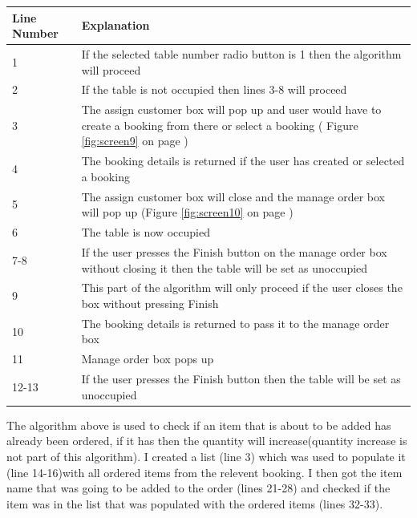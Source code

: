 \begin{center}
\begin{tabular}{|p{5cm}|p{7.5cm}|}
\hline
\textbf{Line Number} & \textbf{Explanation} \\ \hline
1 & If the selected table number radio button is 1 then the algorithm will proceed \\ \hline
2 & If the table is not occupied then lines 3-8 will proceed \\ \hline
3 & The assign customer box will pop up and user would have to create a booking from there or select a booking ( Figure \ref{fig:screen9} on page \pageref{fig:screen9}) \\ \hline
4 & The booking details is returned if the user has created or selected a booking \\ \hline
5 & The assign customer box will close and the manage order box will pop up  (Figure \ref{fig:screen10} on page \pageref{fig:screen10}) \\ \hline
6 & The table is now occupied \\ \hline
7-8 & If the user presses the Finish button on the manage order box without closing it then the table will be set as unoccupied \\ \hline
9 & This part of the algorithm will only proceed if the user closes the box without pressing Finish \\ \hline
10 & The booking details is returned to pass it to the manage order box \\ \hline
11& Manage order box pops up \\ \hline
12-13 & If the user presses the Finish button then the table will be set as unoccupied \\ \hline
 
\end{tabular}
\end{center}

\newpage
{}
The algorithm above is used to check if an item that is about to be added has already been ordered, if it has then the quantity will increase(quantity increase is not part of this algorithm). I created a list (line 3) which was used to populate it (line 14-16)with all ordered items from the relevent booking. I then got the item name that was going to be added to the order (lines 21-28) and checked if the item was in the list that was populated with the ordered items (lines 32-33).

\newpage

